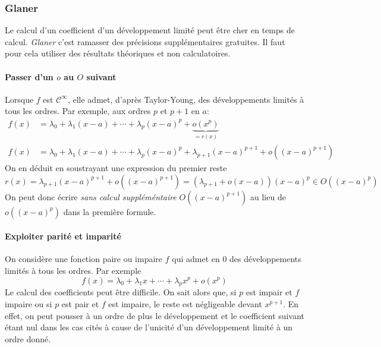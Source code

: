 \subsubsection{Glaner}
Le calcul d'un coefficient d'un développement limité peut être cher en temps de calcul. \emph{Glaner} c'est ramasser des précisions supplémentaires \og gratuites\fg. Il faut pour cela utiliser des résultats théoriques et non calculatoires.
\paragraph{Passer d'un $o$ au $O$ suivant}
Lorsque $f$ est $\mathcal C^\infty$, elle admet, d'après Taylor-Young, des développements limités à tous les ordres. Par exemple, aux ordres $p$ et $p+1$ en $a$:
\begin{align*}
 f(x) &= \lambda_0 + \lambda_1(x-a)+\cdots+\lambda_p(x-a)^p+ \underset{= r(x)}{\underbrace{o(x^p)}}\\
 f(x) &= \lambda_0 + \lambda_1(x-a)+\cdots+\lambda_p(x-a)^p+ \lambda_{p+1}(x-a)^{p+1}+o((x-a)^{p+1})
\end{align*}
On en déduit en soustrayant une expression du premier reste
\begin{displaymath}
 r(x)= \lambda_{p+1}(x-a)^{p+1}+o((x-a)^{p+1})=\left(\lambda_{p+1}+o(x-a) \right)(x-a)^p \in O((x-a)^p) 
\end{displaymath}
On peut donc écrire \emph{sans calcul suppléméntaire} $O((x-a)^{p+1})$ au lieu de $o((x-a)^p)$ dans la première formule.
\paragraph{Exploiter parité et imparité}
On considère une fonction paire ou impaire $f$ qui admet en $0$ des développements limités à tous les ordres. Par exemple
\begin{displaymath}
 f(x) = \lambda_0+\lambda_1x+\cdots+\lambda_p x^p + o(x^p)
\end{displaymath}
Le calcul des coefficients peut être difficile. On sait alors que, si $p$ est impair et $f$ impaire ou si $p$ est pair et $f$ est impaire, le reste est négligeable devant $x^{p+1}$. En effet, on peut pousser à un ordre de plus le développement et le coefficient suivant étant nul dans les cas cités à cause de l'unicité d'un développement limité à un ordre donné.

